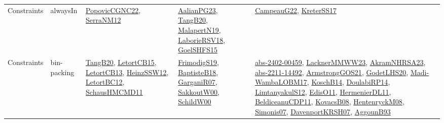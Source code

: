 {\begin{longtable}{lp{3cm}>{\raggedright}p{6cm}>{\raggedright}p{6cm}p{8cm}}
Constraints & alwaysIn & \href{papers/PopovicCGNC22.pdf}{PopovicCGNC22}\cite{PopovicCGNC22}, \href{papers/SerraNM12.pdf}{SerraNM12}\cite{SerraNM12} & \href{papers/AalianPG23.pdf}{AalianPG23}\cite{AalianPG23}, \href{papers/TangB20.pdf}{TangB20}\cite{TangB20}, \href{papers/MalapertN19.pdf}{MalapertN19}\cite{MalapertN19}, \href{articles/LaborieRSV18.pdf}{LaborieRSV18}\cite{LaborieRSV18}, \href{articles/GoelSHFS15.pdf}{GoelSHFS15}\cite{GoelSHFS15} & \href{articles/CampeauG22.pdf}{CampeauG22}\cite{CampeauG22}, \href{articles/KreterSS17.pdf}{KreterSS17}\cite{KreterSS17}\\
Constraints & bin-packing & \href{papers/TangB20.pdf}{TangB20}\cite{TangB20}, \href{articles/LetortCB15.pdf}{LetortCB15}\cite{LetortCB15}, \href{papers/LetortCB13.pdf}{LetortCB13}\cite{LetortCB13}, \href{articles/HeinzSSW12.pdf}{HeinzSSW12}\cite{HeinzSSW12}, \href{papers/LetortBC12.pdf}{LetortBC12}\cite{LetortBC12}, \href{articles/SchausHMCMD11.pdf}{SchausHMCMD11}\cite{SchausHMCMD11} & \href{papers/FrimodigS19.pdf}{FrimodigS19}\cite{FrimodigS19}, \href{articles/BaptisteB18.pdf}{BaptisteB18}\cite{BaptisteB18}, \href{papers/GarganiR07.pdf}{GarganiR07}\cite{GarganiR07}, \href{articles/SakkoutW00.pdf}{SakkoutW00}\cite{SakkoutW00}, \href{articles/SchildW00.pdf}{SchildW00}\cite{SchildW00} & \href{articles/abs-2402-00459.pdf}{abs-2402-00459}\cite{abs-2402-00459}, \href{articles/LacknerMMWW23.pdf}{LacknerMMWW23}\cite{LacknerMMWW23}, \href{articles/AkramNHRSA23.pdf}{AkramNHRSA23}\cite{AkramNHRSA23}, \href{articles/abs-2211-14492.pdf}{abs-2211-14492}\cite{abs-2211-14492}, \href{papers/ArmstrongGOS21.pdf}{ArmstrongGOS21}\cite{ArmstrongGOS21}, \href{papers/GodetLHS20.pdf}{GodetLHS20}\cite{GodetLHS20}, \href{papers/Madi-WambaLOBM17.pdf}{Madi-WambaLOBM17}\cite{Madi-WambaLOBM17}, \href{papers/KoschB14.pdf}{KoschB14}\cite{KoschB14}, \href{papers/DoulabiRP14.pdf}{DoulabiRP14}\cite{DoulabiRP14}, \href{articles/LimtanyakulS12.pdf}{LimtanyakulS12}\cite{LimtanyakulS12}, \href{papers/EdisO11.pdf}{EdisO11}\cite{EdisO11}, \href{papers/HermenierDL11.pdf}{HermenierDL11}\cite{HermenierDL11}, \href{articles/BeldiceanuCDP11.pdf}{BeldiceanuCDP11}\cite{BeldiceanuCDP11}, \href{articles/KovacsB08.pdf}{KovacsB08}\cite{KovacsB08}, \href{papers/HentenryckM08.pdf}{HentenryckM08}\cite{HentenryckM08}, \href{articles/Simonis07.pdf}{Simonis07}\cite{Simonis07}, \href{papers/DavenportKRSH07.pdf}{DavenportKRSH07}\cite{DavenportKRSH07}, \href{articles/AggounB93.pdf}{AggounB93}\cite{AggounB93}\\

\end{longtable}}
